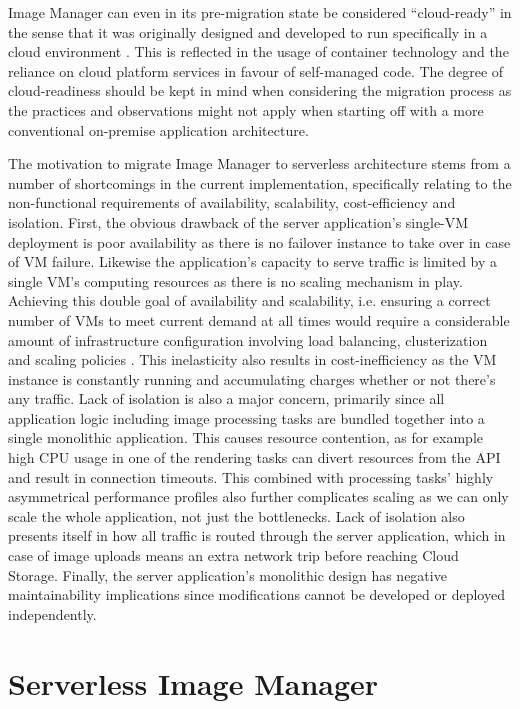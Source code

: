 Image Manager can even in its pre-migration state be considered ``cloud-ready'' in the sense that it was originally designed and developed to run specifically in a cloud environment \parencite{pozdniakova17cloudready}. This is reflected in the usage of container technology and the reliance on cloud platform services in favour of self-managed code. The degree of cloud-readiness should be kept in mind when considering the migration process as the practices and observations might not apply when starting off with a more conventional on-premise application architecture.

The motivation to migrate Image Manager to serverless architecture stems from a number of shortcomings in the current implementation, specifically relating to the non-functional requirements of availability, scalability, cost-efficiency and isolation. First, the obvious drawback of the server application's single-VM deployment is poor availability as there is no failover instance to take over in case of VM failure. Likewise the application's capacity to serve traffic is limited by a single VM's computing resources as there is no scaling mechanism in play. Achieving this double goal of availability and scalability, i.e. ensuring a correct number of VMs to meet current demand at all times would require a considerable amount of infrastructure configuration involving load balancing, clusterization and scaling policies \parencite{jonas19berkeleyView}. This inelasticity also results in cost-inefficiency as the VM instance is constantly running and accumulating charges whether or not there's any traffic. Lack of isolation is also a major concern, primarily since all application logic including image processing tasks are bundled together into a single monolithic application. This causes resource contention, as for example high CPU usage in one of the rendering tasks can divert resources from the API and result in connection timeouts. This combined with processing tasks' highly asymmetrical performance profiles also further complicates scaling as we can only scale the whole application, not just the bottlenecks. Lack of isolation also presents itself in how all traffic is routed through the server application, which in case of image uploads means an extra network trip before reaching Cloud Storage. Finally, the server application's monolithic design has negative maintainability implications since modifications cannot be developed or deployed independently.

\section{Serverless Image Manager}

